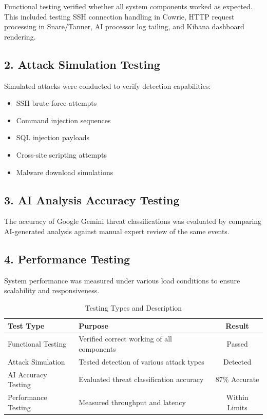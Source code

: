 \documentclass[12pt,a4paper]{report}
\begin{document}
Functional testing verified whether all system components worked as expected. This included testing SSH connection handling in Cowrie, HTTP request processing in Snare/Tanner, AI processor log tailing, and Kibana dashboard rendering.

\subsection*{2. Attack Simulation Testing}

Simulated attacks were conducted to verify detection capabilities:
\begin{itemize}
\item SSH brute force attempts
\item Command injection sequences
\item SQL injection payloads
\item Cross-site scripting attempts
\item Malware download simulations
\end{itemize}

\subsection*{3. AI Analysis Accuracy Testing}

The accuracy of Google Gemini threat classifications was evaluated by comparing AI-generated analysis against manual expert review of the same events.

\subsection*{4. Performance Testing}

System performance was measured under various load conditions to ensure scalability and responsiveness.

\begin{table}[h]
\centering
\caption{Testing Types and Description}
\label{tab:testing_types}
\begin{tabular}{|l|p{7cm}|c|}
\hline
\textbf{Test Type} & \textbf{Purpose} & \textbf{Result} \\
\hline
Functional Testing & Verified correct working of all components & Passed \\
\hline
Attack Simulation & Tested detection of various attack types & Detected \\
\hline
AI Accuracy Testing & Evaluated threat classification accuracy & 87\% Accurate \\
\hline
Performance Testing & Measured throughput and latency & Within Limits \\
\hline
\end{tabular}
\end{table}
\end{document}
